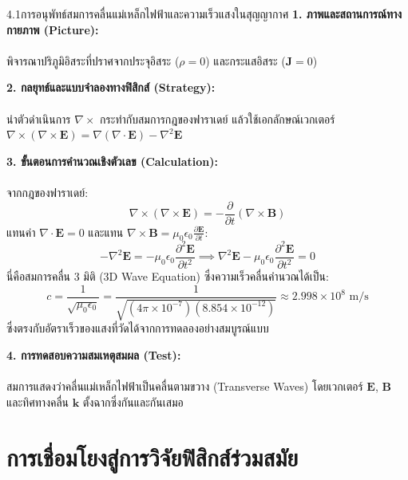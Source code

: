 \begin{psctexample}{4.1}{การอนุพัทธ์สมการคลื่นแม่เหล็กไฟฟ้าและความเร็วแสงในสุญญากาศ}
\textbf{1. ภาพและสถานการณ์ทางกายภาพ (Picture):}\\\\ พิจารณาปริภูมิอิสระที่ปราศจากประจุอิสระ ($\rho = 0$) และกระแสอิสระ ($\mathbf{J} = 0$)

\vspace{4pt}
\textbf{2. กลยุทธ์และแบบจำลองทางฟิสิกส์ (Strategy):}\\\\ นำตัวดำเนินการ $\nabla \times$ กระทำกับสมการกฎของฟาราเดย์ แล้วใช้เอกลักษณ์เวกเตอร์ $\nabla \times (\nabla \times \mathbf{E}) = \nabla(\nabla \cdot \mathbf{E}) - \nabla^2 \mathbf{E}$

\vspace{4pt}
\textbf{3. ขั้นตอนการคำนวณเชิงตัวเลข (Calculation):}\\\\ จากกฎของฟาราเดย์:
\begin{equation}
\nabla \times (\nabla \times \mathbf{E}) = -\frac{\partial}{\partial t}(\nabla \times \mathbf{B})
\end{equation}
แทนค่า $\nabla \cdot \mathbf{E} = 0$ และแทน $\nabla \times \mathbf{B} = \mu_0\epsilon_0 \frac{\partial \mathbf{E}}{\partial t}$:
\begin{equation}
-\nabla^2 \mathbf{E} = -\mu_0\epsilon_0 \frac{\partial^2 \mathbf{E}}{\partial t^2} \implies \nabla^2 \mathbf{E} - \mu_0\epsilon_0 \frac{\partial^2 \mathbf{E}}{\partial t^2} = 0
\end{equation}
นี่คือสมการคลื่น 3 มิติ (3D Wave Equation) ซึ่งความเร็วคลื่นคำนวณได้เป็น:
\begin{equation}
c = \frac{1}{\sqrt{\mu_0\epsilon_0}} = \frac{1}{\sqrt{(4\pi \times 10^{-7})(8.854 \times 10^{-12})}} \approx 2.998 \times 10^8\text{ m/s}
\end{equation}
ซึ่งตรงกับอัตราเร็วของแสงที่วัดได้จากการทดลองอย่างสมบูรณ์แบบ

\vspace{4pt}
\textbf{4. การทดสอบความสมเหตุสมผล (Test):}\\\\ สมการแสดงว่าคลื่นแม่เหล็กไฟฟ้าเป็นคลื่นตามขวาง (Transverse Waves) โดยเวกเตอร์ $\mathbf{E}$, $\mathbf{B}$ และทิศทางคลื่น $\mathbf{k}$ ตั้งฉากซึ่งกันและกันเสมอ
\end{psctexample}

\section{การเชื่อมโยงสู่การวิจัยฟิสิกส์ร่วมสมัย}

